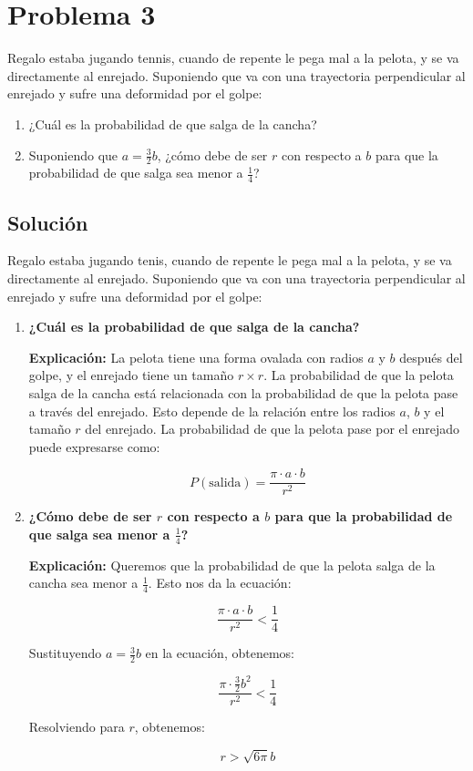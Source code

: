 \documentclass[titlepage]{article} %
\begin{document}
    \section*{\Large Problema 3}

\Large Regalo estaba jugando tennis, cuando de repente le pega mal a la pelota, y se va directamente al enrejado. Suponiendo que va con una trayectoria perpendicular al enrejado y sufre una deformidad por el golpe:

\begin{enumerate}
    \item ¿Cuál es la probabilidad de que salga de la cancha?
    \item Suponiendo que $a = \frac{3}{2} b$, ¿cómo debe de ser $r$ con respecto a $b$ para que la probabilidad de que salga sea menor a $\frac{1}{4}$?
\end{enumerate}

\subsection*{\Large Solución}

\Large
Regalo estaba jugando tenis, cuando de repente le pega mal a la pelota, y se va directamente al enrejado. Suponiendo que va con una trayectoria perpendicular al enrejado y sufre una deformidad por el golpe:

\begin{enumerate}
    \item \textbf{¿Cuál es la probabilidad de que salga de la cancha?}
    
    \textbf{Explicación:}  
    La pelota tiene una forma ovalada con radios \( a \) y \( b \) después del golpe, y el enrejado tiene un tamaño \( r \times r \). La probabilidad de que la pelota salga de la cancha está relacionada con la probabilidad de que la pelota pase a través del enrejado. Esto depende de la relación entre los radios \( a \), \( b \) y el tamaño \( r \) del enrejado.  
    La probabilidad de que la pelota pase por el enrejado puede expresarse como:
    
    \[
    P(\text{salida}) = \frac{\pi \cdot a \cdot b}{r^2}
    \]
    
    \item \textbf{¿Cómo debe de ser \( r \) con respecto a \( b \) para que la probabilidad de que salga sea menor a \( \frac{1}{4} \)?}
    
    \textbf{Explicación:}  
    Queremos que la probabilidad de que la pelota salga de la cancha sea menor a \( \frac{1}{4} \). Esto nos da la ecuación:
    
    \[
    \frac{\pi \cdot a \cdot b}{r^2} < \frac{1}{4}
    \]
    
    Sustituyendo \( a = \frac{3}{2} b \) en la ecuación, obtenemos:
    
    \[
    \frac{\pi \cdot \frac{3}{2} b^2}{r^2} < \frac{1}{4}
    \]
    
    Resolviendo para \( r \), obtenemos:
    
    \[
    r > \sqrt{6 \pi} b
    \]
\end{enumerate}
\end{document}
